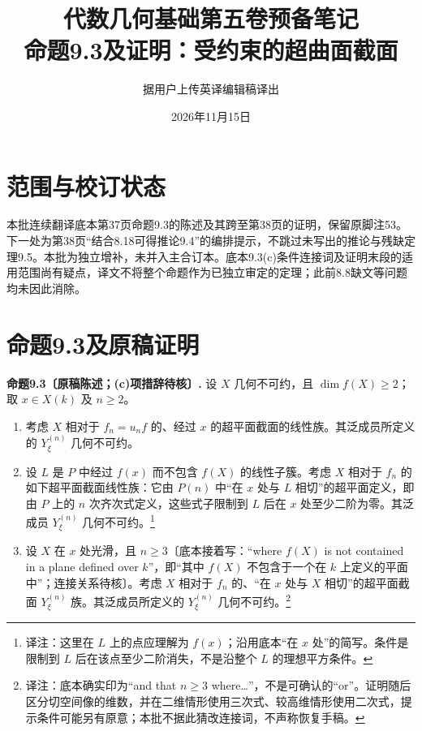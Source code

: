\documentclass[openany]{ctexbook}
\title{代数几何基础第五卷预备笔记\\命题9.3及证明：受约束的超曲面截面}
\author{据用户上传英译编辑稿译出}
\date{2026年11月15日}
\newcommand{\note}[1]{\footnote{译注：#1}}
\begin{document}
\maketitle
\chapter*{范围与校订状态}
本批连续翻译底本第37页命题9.3的陈述及其跨至第38页的证明，保留原脚注53。下一处为第38页“结合8.18可得推论9.4”的编排提示，不跳过未写出的推论与残缺定理9.5。本批为独立增补，未并入主合订本。底本9.3(c)条件连接词及证明末段的适用范围尚有疑点，译文不将整个命题作为已独立审定的定理；此前8.8缺文等问题均未因此消除。
\chapter*{命题9.3及原稿证明}
\noindent\textbf{命题9.3〔原稿陈述；(c)项措辞待核〕.}
设 $X$ 几何不可约，且 $\dim f(X)\ge2$；取 $x\in X(k)$ 及 $n\ge2$。
\begin{enumerate}
\item[(a)] 考虑 $X$ 相对于 $f_n=u_n f$ 的、经过 $x$ 的超平面截面的线性族。其泛成员所定义的 $Y^{(n)}_\xi$ 几何不可约。
\item[(b)] 设 $L$ 是 $P$ 中经过 $f(x)$ 而不包含 $f(X)$ 的线性子簇。考虑 $X$ 相对于 $f_n$ 的如下超平面截面线性族：它由 $P(n)$ 中“在 $x$ 处与 $L$ 相切”的超平面定义，即由 $P$ 上的 $n$ 次齐次式定义，这些式子限制到 $L$ 后在 $x$ 处至少二阶为零。其泛成员 $Y^{(n)}_\xi$ 几何不可约。\note{这里在 $L$ 上的点应理解为 $f(x)$；沿用底本“在 $x$ 处”的简写。条件是限制到 $L$ 后在该点至少二阶消失，不是沿整个 $L$ 的理想平方条件。}
\item[(c)] 设 $X$ 在 $x$ 处光滑，且 $n\ge3$〔底本接着写：“where $f(X)$ is not contained in a plane defined over $k$”，即“其中 $f(X)$ 不包含于一个在 $k$ 上定义的平面中”；连接关系待核〕。考虑 $X$ 相对于 $f_n$ 的、“在 $x$ 处与 $X$ 相切”的超平面截面 $Y^{(n)}_\xi$ 族。其泛成员所定义的 $Y^{(n)}_\xi$ 几何不可约。\note{底本确实印为“and that $n\ge3$ where…”，不是可确认的“or”。证明随后区分切空间像的维数，并在二维情形使用三次式、较高维情形使用二次式，提示条件可能另有原意；本批不据此猜改连接词，不声称恢复手稿。}
\end{enumerate}
\end{document}
